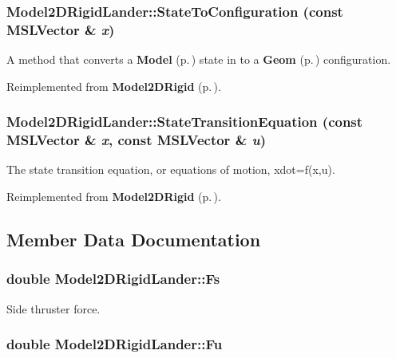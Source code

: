 \subsubsection{ Model2DRigid\-Lander::State\-To\-Configuration (const {\bf MSLVector} \& {\em x})\hspace{0.3cm}{\tt  [virtual]}}\label{classModel2DRigidLander_a3}


A method that converts a {\bf Model} {\rm (p.\,\pageref{classModel})} state in to a {\bf Geom} {\rm (p.\,\pageref{classGeom})} configuration.



Reimplemented from {\bf Model2DRigid} {\rm (p.\,\pageref{classModel2DRigid_a6})}.
\subsubsection{ Model2DRigid\-Lander::State\-Transition\-Equation (const {\bf MSLVector} \& {\em x}, const {\bf MSLVector} \& {\em u})\hspace{0.3cm}{\tt  [virtual]}}\label{classModel2DRigidLander_a4}


The state transition equation, or equations of motion, xdot=f(x,u).



Reimplemented from {\bf Model2DRigid} {\rm (p.\,\pageref{classModel2DRigid_a3})}.

\subsection{Member Data Documentation}
\subsubsection{\setlength{\rightskip}{0pt plus 5cm}double Model2DRigid\-Lander::Fs}\label{classModel2DRigidLander_m2}


Side thruster force.

\subsubsection{\setlength{\rightskip}{0pt plus 5cm}double Model2DRigid\-Lander::Fu}\label{classModel2DRigidLander_m3}


